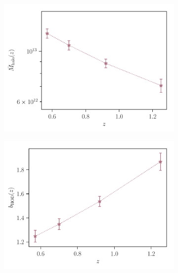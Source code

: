 \documentclass[a4paper,11pt]{article}
\begin{document}
      \begin{figure}
        \begin{center}
          \begin{subfigure}{0.32\textwidth}
          \includegraphics[width=\textwidth]{figures/M_halo_mPk=HOD_fix=alpha-fc-sigmaM_HOD=zevol_fit=pz-shifts-pz-widths+prior=0p2_fit=auto+cross_cosmo=const_cov=G+NG+SSC-LINBIAS_HOD-param=zfid_clfit=HOD-zevol.pdf}
          \end{subfigure}
          \begin{subfigure}{0.32\textwidth}
          \includegraphics[width=\textwidth]{figures/bias-redshift_mPk=HOD_fix=alpha-fc-sigmaM_HOD=zevol_fit=pz-shifts-pz-widths+prior=0p2_fit=auto+cross_cosmo=const_cov=G+NG+SSC-LINBIAS_HOD-param=zfid_clfit=HOD-zevol.pdf}

\end{subfigure}
\end{center}
\end{figure}
\end{document}
